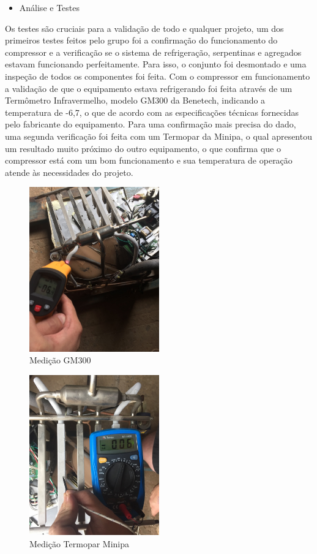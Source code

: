 \begin{itemize}
\item Análise e Testes
\end{itemize}
			 Os testes são cruciais para a validação de todo e qualquer projeto, um dos primeiros testes feitos pelo grupo foi a confirmação do funcionamento do compressor e a verificação se o sistema de refrigeração, serpentinas e agregados estavam funcionando perfeitamente. Para isso, o conjunto foi desmontado e uma inspeção de todos os componentes foi feita. Com o compressor em funcionamento a validação de que o equipamento estava refrigerando foi feita através de um Termômetro Infravermelho, modelo GM300 da Benetech, indicando a temperatura de -6,7\degree, o que de acordo com as especificações técnicas fornecidas pelo fabricante do equipamento. Para uma confirmação mais precisa do dado, uma segunda verificação foi feita com um Termopar da Minipa, o qual apresentou um resultado muito próximo do outro equipamento, o que confirma que o compressor está com um bom funcionamento e sua temperatura de operação atende às necessidades do projeto.

 \begin{figure}[H]
    \centering
    \includegraphics[width=0.5\textwidth]{figuras/medicao_laser}
    \caption{Medição GM300}
    \label{fig:medicao_laser}
\end{figure}

\begin{figure}[H]
    \centering
    \includegraphics[width=0.5\textwidth]{figuras/medicao_termopar}
    \caption{Medição Termopar Minipa}
    \label{fig:medicao_termopar}
\end{figure}

